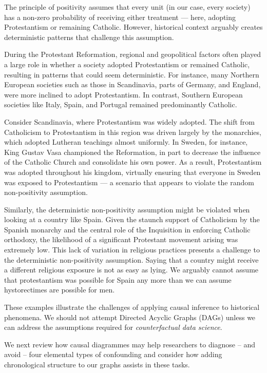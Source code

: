 \documentclass[
  singlecolumn]{report}
\begin{document}
The principle of positivity assumes that every unit (in our case, every
society) has a non-zero probability of receiving either treatment ---
here, adopting Protestantism or remaining Catholic. However, historical
context arguably creates deterministic patterns that challenge this
assumption.

During the Protestant Reformation, regional and geopolitical factors
often played a large role in whether a society adopted Protestantism or
remained Catholic, resulting in patterns that could seem deterministic.
For instance, many Northern European societies such as those in
Scandinavia, parts of Germany, and England, were more inclined to adopt
Protestantism. In contrast, Southern European societies like Italy,
Spain, and Portugal remained predominantly Catholic.

Consider Scandinavia, where Protestantism was widely adopted. The shift
from Catholicism to Protestantism in this region was driven largely by
the monarchies, which adopted Lutheran teachings almost uniformly. In
Sweden, for instance, King Gustav Vasa championed the Reformation, in
part to decrease the influence of the Catholic Church and consolidate
his own power. As a result, Protestantism was adopted throughout his
kingdom, virtually ensuring that everyone in Sweden was exposed to
Protestantism --- a scenario that appears to violate the random
non-positivity assumption.

Similarly, the deterministic non-positivity assumption might be violated
when looking at a country like Spain. Given the staunch support of
Catholicism by the Spanish monarchy and the central role of the
Inquisition in enforcing Catholic orthodoxy, the likelihood of a
significant Protestant movement arising was extremely low. This lack of
variation in religious practices presents a challenge to the
deterministic non-positivity assumption. Saying that a country might
receive a different religious exposure is not as easy as lying. We
arguably cannot assume that protestantism was possible for Spain any
more than we can assume hystorectimes are possible for men.

These examples illustrate the challenges of applying causal inference to
historical phenomena. We should not attempt Directed Acyclic Graphs
(DAGs) unless we can address the assumptions required for
\emph{counterfactual data science}.

We next review how causal diagrammes may help researchers to diagnose --
and avoid -- four elemental types of confounding and consider how adding
chronological structure to our graphs assists in these tasks.
\end{document}
